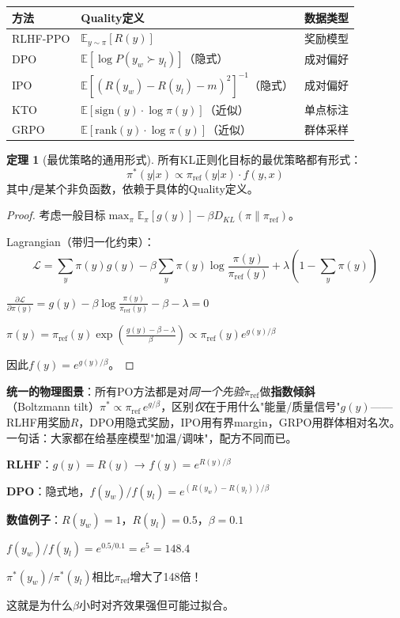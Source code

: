 \documentclass[11pt,a4paper]{article}
\theoremstyle{definition}
\newtheorem{theorem}{定理}[section]
\begin{document}
\begin{center}
\begin{tabular}{l|l|l}
\toprule
\textbf{方法} & \textbf{Quality定义} & \textbf{数据类型} \\
\midrule
RLHF-PPO & $\mathbb{E}_{y \sim \pi}[R(y)]$ & 奖励模型 \\
DPO & $\mathbb{E}[\log P(y_w \succ y_l)]$（隐式） & 成对偏好 \\
IPO & $\mathbb{E}[(R(y_w) - R(y_l) - m)^2]^{-1}$（隐式） & 成对偏好 \\
KTO & $\mathbb{E}[\text{sign}(y) \cdot \log \pi(y)]$（近似） & 单点标注 \\
GRPO & $\mathbb{E}[\text{rank}(y) \cdot \log \pi(y)]$（近似） & 群体采样 \\
\bottomrule
\end{tabular}
\end{center}

\begin{theorem}[最优策略的通用形式]
所有KL正则化目标的最优策略都有形式：
\[
\pi^*(y|x) \propto \pi_{\text{ref}}(y|x) \cdot f(y, x)
\]
其中$f$是某个非负函数，依赖于具体的Quality定义。
\end{theorem}

\begin{proof}
考虑一般目标$\max_\pi \mathbb{E}_\pi[g(y)] - \beta D_{KL}(\pi \| \pi_{\text{ref}})$。

Lagrangian（带归一化约束）：
\[
\mathcal{L} = \sum_y \pi(y) g(y) - \beta \sum_y \pi(y) \log \frac{\pi(y)}{\pi_{\text{ref}}(y)} + \lambda(1 - \sum_y \pi(y))
\]

$\frac{\partial \mathcal{L}}{\partial \pi(y)} = g(y) - \beta \log \frac{\pi(y)}{\pi_{\text{ref}}(y)} - \beta - \lambda = 0$

$\pi(y) = \pi_{\text{ref}}(y) \exp\left(\frac{g(y) - \beta - \lambda}{\beta}\right) \propto \pi_{\text{ref}}(y) e^{g(y)/\beta}$

因此$f(y) = e^{g(y)/\beta}$。
\end{proof}

\textbf{统一的物理图景}：所有PO方法都是对\emph{同一个先验}$\pi_{\text{ref}}$做\textbf{指数倾斜}（Boltzmann tilt）$\pi^*\propto\pi_{\text{ref}}\,e^{g/\beta}$，区别\emph{仅}在于用什么"能量/质量信号"$g(y)$——RLHF用奖励$R$，DPO用隐式奖励，IPO用有界margin，GRPO用群体相对名次。一句话：大家都在给基座模型"加温/调味"，配方不同而已。

\begin{calculation}[各方法的$f(y)$]
\textbf{RLHF}：$g(y) = R(y)$ → $f(y) = e^{R(y)/\beta}$

\textbf{DPO}：隐式地，$f(y_w)/f(y_l) = e^{(R(y_w) - R(y_l))/\beta}$

\textbf{数值例子}：$R(y_w) = 1$，$R(y_l) = 0.5$，$\beta = 0.1$

$f(y_w)/f(y_l) = e^{0.5/0.1} = e^5 = 148.4$

$\pi^*(y_w)/\pi^*(y_l)$相比$\pi_{\text{ref}}$增大了148倍！

这就是为什么$\beta$小时对齐效果强但可能过拟合。
\end{calculation}
\end{document}
